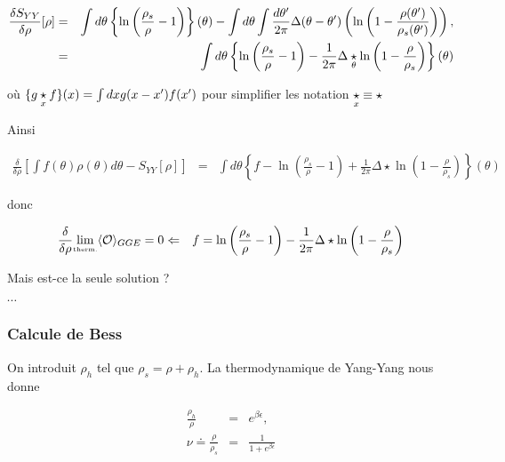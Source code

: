	\begin{eqnarray}
		\frac{ \delta S_{YY} }{ \delta \rho } [\rho ]  & = & \int  d\theta\left \{ \ln \left ( \frac{ \rho_s}{ \rho} - 1 \right )  \right \} ( \theta ) -  \int  d\theta    \int  \frac{d\theta'}{2 \pi}  \Delta (   \theta   - \theta' ) \left ( \ln \left ( 1 - \frac{ \rho  ( \theta ')}{ \rho_s  ( \theta ')}\right ) \right )  ,	\\
		& = & \int  d\theta\left \{ \ln \left ( \frac{ \rho_s}{ \rho} - 1 \right ) - \frac{1}{2 \pi} \Delta \underset{ \tiny \theta }{\star} \ln \left ( 1 - \frac{ \rho}{ \rho_s}\right )  \right \} (\theta ) 		
	\end{eqnarray}
	
	où $\{ g \underset{ \tiny x }{\star} f \} ( x ) = \int d x g ( x - x') f ( x' ) $ pour simplifier les notation  $\underset{ \tiny x }{\star}\equiv  \star $ 
	
	Ainsi 
	
	\begin{eqnarray}
		\frac{\delta}{\delta \rho} \left [ \int  f(\theta) \rho(\theta )  d\theta - S_{YY} [\rho] \right ] & = & 	\int  d\theta\left \{ f - \ln \left ( \frac{ \rho_s}{ \rho} - 1 \right ) + \frac{1}{2 \pi} \Delta \star \ln \left ( 1 - \frac{ \rho}{ \rho_s}\right )  \right \} (\theta )
	\end{eqnarray}
	
	donc 
	
	\begin{eqnarray} 
		\frac{\delta}{\delta \rho}	\underset{\mbox{\tiny therm.}}{\lim} \langle \mathcal{O}\rangle_{GGE} = 0 & \Leftarrow & f = \ln \left ( \frac{ \rho_s}{ \rho} - 1 \right ) - \frac{1}{2 \pi} \Delta \star \ln \left ( 1 - \frac{ \rho}{ \rho_s}\right )		
	\end{eqnarray}
	
	Mais est-ce la seule solution ? 
 
	
	{\color{red} $\cdots$}\\
	
\subsubsection{Calcule de Bess}

On introduit $\rho_h$ tel que $\rho_s = \rho + \rho_h$. La thermodynamique de Yang-Yang nous donne 

\begin{eqnarray}
	\frac{\rho_h}{\rho} & = & e^{\beta \epsilon }, \\
	\nu \doteq \frac{\rho}{\rho_s} & = & \frac{1}{1+ e ^{\beta \epsilon} }	
\end{eqnarray}

